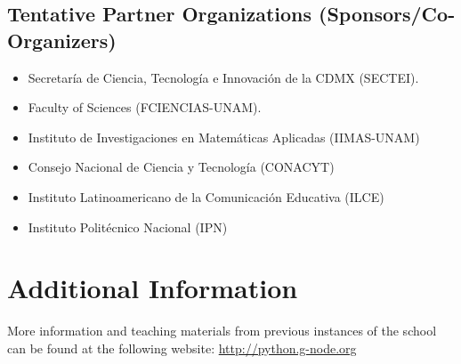 \documentclass{article}[11pt]
\begin{document}
\subsection*{Tentative Partner Organizations (Sponsors/Co-Organizers)}
\begin{itemize}
    \item Secretar\'ia de Ciencia, Tecnolog\'ia e Innovaci\'on de la CDMX
    (SECTEI).
    \item Faculty of Sciences (FCIENCIAS-UNAM).
    \item Instituto de Investigaciones en Matem\'aticas Aplicadas (IIMAS-UNAM)
    \item Consejo Nacional de Ciencia y Tecnolog\'ia (CONACYT)
    \item Instituto Latinoamericano de la Comunicaci\'on Educativa (ILCE)
    \item Instituto Polit\'ecnico Nacional (IPN)
\end{itemize}

\section*{Additional Information}
More information and teaching materials from previous instances of the school
can be found at the following website: \url{http://python.g-node.org}
\end{document}
